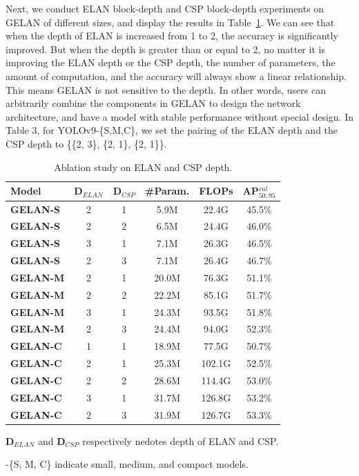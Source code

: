 \documentclass[10pt,twocolumn,letterpaper]{article}
\begin{document}
	\newpage
	
	Next, we conduct ELAN block-depth and CSP block-depth experiments on GELAN of different sizes, and display the results in Table~\ref{table:depth}.  We can see that when the depth of ELAN is increased from 1 to 2, the accuracy is significantly improved.  But when the depth is greater than or equal to 2, no matter it is improving the ELAN depth or the CSP depth, the number of parameters, the amount of computation, and the accuracy will always show a linear relationship.  This means GELAN is not sensitive to the depth.  In other words, users can arbitrarily combine the components in GELAN to design the network architecture, and have a model with stable performance without special design.  In Table 3, for YOLOv9-\{S,M,C\}, we set the pairing of the ELAN depth and the CSP depth to \{\{2, 3\}, \{2, 1\}, \{2, 1\}\}.

	\begin{table}[h]
	\centering
	\begin{threeparttable}[h]
		\footnotesize
		\caption{Ablation study on ELAN and CSP depth.}
		\label{table:depth}
		\setlength\tabcolsep{5.0pt}
		\begin{tabular}{lccccc}
			\toprule
			\textbf{Model} & \textbf{D$_{ELAN}$} & \textbf{D$_{CSP}$} & \textbf{\#Param.} & \textbf{FLOPs} & \textbf{AP$^{val}_{50:95}$} \\	
			\midrule
			\textbf{GELAN-S} & 2 & 1 & 5.9M & 22.4G & 45.5\% \\
			\textbf{GELAN-S} & 2 & 2 & 6.5M & 24.4G & 46.0\% \\
			\textbf{GELAN-S} & 3 & 1 & 7.1M & 26.3G & 46.5\% \\
			\textbf{GELAN-S} & 2 & 3 & 7.1M & 26.4G & 46.7\% \\
			\midrule
			\textbf{GELAN-M} & 2 & 1 & 20.0M & 76.3G & 51.1\% \\
			\textbf{GELAN-M} & 2 & 2 & 22.2M & 85.1G & 51.7\% \\
			\textbf{GELAN-M} & 3 & 1 & 24.3M & 93.5G & 51.8\% \\
			\textbf{GELAN-M} & 2 & 3 & 24.4M & 94.0G & 52.3\% \\
			\midrule
			\textbf{GELAN-C} & 1 & 1 & 18.9M & 77.5G & 50.7\% \\
			\textbf{GELAN-C} & 2 & 1 & 25.3M & 102.1G & 52.5\% \\
			\textbf{GELAN-C} & 2 & 2 & 28.6M & 114.4G & 53.0\% \\
			\textbf{GELAN-C} & 3 & 1 & 31.7M & 126.8G & 53.2\% \\
			\textbf{GELAN-C} & 2 & 3 & 31.9M & 126.7G & 53.3\% \\
			\bottomrule
		\end{tabular}
		\begin{tablenotes}[flushleft]
			\footnotesize
			\item[1] \textbf{D$_{ELAN}$} and \textbf{D$_{CSP}$} respectively nedotes depth of ELAN and CSP.
			\item[2] -\{S, M, C\} indicate small, medium, and compact models.
		\end{tablenotes}
	\end{threeparttable}
	\end{table}
\end{document}
